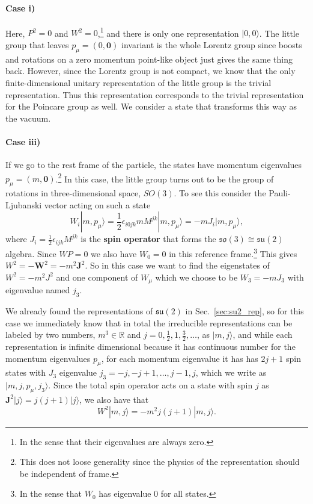 \documentclass[notes.tex]{subfiles}
\begin{document}
\paragraph{Case i)} Here, $P^2=0$ and $W^2=0$,\footnote{In the sense that their eigenvalues are always zero.} and there is only one representation $|0,0\rangle$. The little group that leaves $p_\mu=(0,\mathbf 0)$ invariant is the whole Lorentz group since boosts and rotations on a zero momentum point-like object just gives the same thing back. However, since the Lorentz group is not compact, we know that the only finite-dimensional unitary representation of the little group is the trivial representation. Thus this representation corresponds to the trivial representation for the Poincare group as well. We consider a state that transforms this way as the vacuum.

\paragraph{Case iii)} If we go to the rest frame of the particle, the states have momentum eigenvalues $p_\mu=(m, \mathbf 0)$.\footnote{This does not loose generality since the physics of the representation should be independent of frame.}  In this case, the little group turns out to be the group of rotations in three-dimensional space, $SO(3)$. To see this consider the Pauli-Ljubanski vector acting on such a state
\begin{equation}
W_i |m, p_\mu\rangle = \frac{1}{2} \epsilon_{i 0 jk}m M^{jk}  |m, p_\mu\rangle= -mJ_i  |m, p_\mu\rangle,
\label{eq:PL_restframe}
\end{equation}
where $J_i = \frac{1}{2} \epsilon_{ijk} M^{jk}$ is the {\bf spin operator} that forms the $\mathfrak{so}(3)\cong\mathfrak{su}(2)$ algebra. Since $WP=0$ we also have $W_0 = 0$ in this reference frame.\footnote{In the sense that $W_0$ has eigenvalue 0 for all states.} This gives $W^2 = -\mathbf W^2 = -m^2\mathbf J^2$.  So in this case we want to find the eigenstates of $W^2=-m^2J^2$ and one component of $W_\mu$ which we choose to be $W_3=-mJ_3$ with eigenvalue named $j_3$.  

We already found the representations of  $\mathfrak{su}(2)$ in Sec.~\ref{sec:su2_rep}, so for this case we immediately know that in total the irreducible representations can be labeled by two numbers, $m^3\in\mathbb R$ and $j=0,\frac{1}{2},1,\frac{3}{2},\ldots$, as $|m,j\rangle$, and while each representation is infinite dimensional because it has continuous number for the momentum eigenvalues $p_\mu$, for each momentum eigenvalue it has has $2j+1$ spin states with $J_3$ eigenvalue $j_3=-j,-j+1,\ldots,j-1,j$, which we write as $|m,j,p_\mu,j_3\rangle$. 
Since the total spin operator acts on a state with spin $j$ as $\mathbf J^2| j\rangle=j(j+1)| j\rangle$, we also have that
\[W^2|m,j\rangle = -m^2 j(j+1)|m,j\rangle.\]
\end{document}
